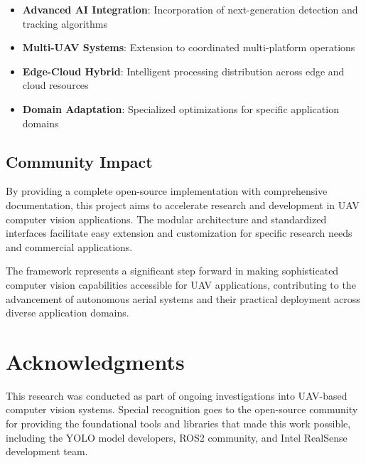 \documentclass[12pt,a4paper]{article}
\begin{document}
\begin{itemize}
    \item \textbf{Advanced AI Integration}: Incorporation of next-generation detection and tracking algorithms
    \item \textbf{Multi-UAV Systems}: Extension to coordinated multi-platform operations
    \item \textbf{Edge-Cloud Hybrid}: Intelligent processing distribution across edge and cloud resources
    \item \textbf{Domain Adaptation}: Specialized optimizations for specific application domains
\end{itemize}

\subsection{Community Impact}

By providing a complete open-source implementation with comprehensive documentation, this project aims to accelerate research and development in UAV computer vision applications. The modular architecture and standardized interfaces facilitate easy extension and customization for specific research needs and commercial applications.

The framework represents a significant step forward in making sophisticated computer vision capabilities accessible for UAV applications, contributing to the advancement of autonomous aerial systems and their practical deployment across diverse application domains.

\section*{Acknowledgments}

This research was conducted as part of ongoing investigations into UAV-based computer vision systems. Special recognition goes to the open-source community for providing the foundational tools and libraries that made this work possible, including the YOLO model developers, ROS2 community, and Intel RealSense development team.
\end{document}
